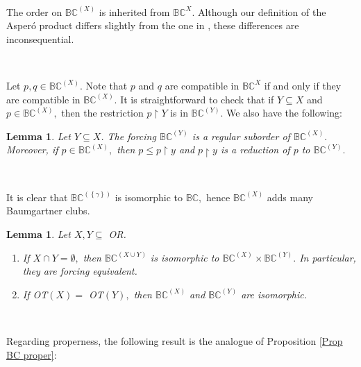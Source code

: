 \documentclass{article}
\newtheorem{lemma}[theorem]{Lemma}
\begin{document}
\qquad\ \ \ 

The order on $\mathbb{BC}^{\left(  X\right)  }$ is inherited from
$\mathbb{BC}^{X}.$ Although our definition of the Asper\'{o} product differs
slightly from the one in \cite{AddingBaumgartnerClubs}, these differences are inconsequential.

\qquad\ \ \ 

Let $p,q\in\mathbb{BC}^{\left(  X\right)  }.$ Note that $p$ and $q$ are
compatible in $\mathbb{BC}^{X}$ if and only if they are compatible in
$\mathbb{BC}^{\left(  X\right)  }.$ It is straightforward to check that if
$Y\subseteq X$ and $p\in\mathbb{BC}^{\left(  X\right)  },$ then the
restriction $p\upharpoonright Y$ is in $\mathbb{BC}^{\left(  Y\right)  }.$ We
also have the following:

\begin{lemma}
Let $Y\subseteq X$. The forcing $\mathbb{BC}^{\left(  Y\right)  }$ is a
regular suborder of $\mathbb{BC}^{\left(  X\right)  }.$ Moreover, if
$p\in\mathbb{BC}^{\left(  X\right)  },$ then $p\leq p\upharpoonright y$ and
$p\upharpoonright y$ is a reduction of $p$ to $\mathbb{BC}^{\left(  Y\right)
}.$
\end{lemma}

\qquad\ \qquad\ \ \ 

It is clear that $\mathbb{BC}^{\left(  \left\{  \gamma\right\}  \right)  }$ is
isomorphic to $\mathbb{BC},$ hence $\mathbb{BC}^{\left(  X\right)  }$ adds
many Baumgartner clubs.

\begin{lemma}
Let $X,Y\subseteq$ \textsf{OR.}

\begin{enumerate}
\item If $X\cap Y=\emptyset,$ then $\mathbb{BC}^{\left(  X\cup Y\right)  }$ is
isomorphic to $\mathbb{BC}^{\left(  X\right)  }\times\mathbb{BC}^{\left(
Y\right)  }.$ In particular, they are forcing equivalent.

\item If \textsf{OT}$\left(  X\right)  =$ \textsf{OT}$\left(  Y\right)  ,$
then $\mathbb{BC}^{\left(  X\right)  }$ and $\mathbb{BC}^{\left(  Y\right)  }$
are isomorphic.
\end{enumerate}
\end{lemma}

\qquad\ \ \ \qquad\ \ \ \qquad\ \qquad\ \ \ \ 

Regarding properness, the following result is the analogue of Proposition
\ref{Prop BC proper}:
\end{document}
